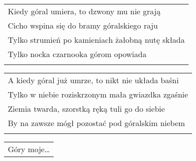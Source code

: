\documentclass[a5paper]{article}
\begin{document}
\noindent
\begin{tabular}{@{}p{9.5cm}@{}}
Kiedy góral umiera, to dzwony mu nie grają \\
Cicho wspina się do bramy góralskiego raju \\
Tylko strumień po kamieniach żałobną nutę składa \\
Tylko nocka czarnooka górom opowiada \\ \\
\end{tabular}

\noindent
\begin{tabular}{@{}p{9.5cm}@{}}
A kiedy góral już umrze, to nikt nie układa baśni \\
Tylko w niebie roziskrzonym mała gwiazdka zgaśnie \\
Ziemia twarda, szorstką ręką tuli go do siebie \\
By na zawsze mógł pozostać pod góralskim niebem \\ \\
\end{tabular}

\noindent
\begin{tabular}{@{}p{8.5cm}@{}}
Góry moje…
\end{tabular}
\end{document}
